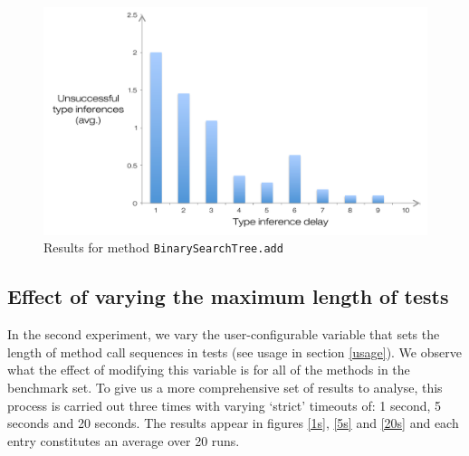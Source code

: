 \begin{figure}[h]
\hspace*{-0.5cm}
\centering
\includegraphics[scale=0.55]{./components/chapter7/bst.pdf}
\caption{Results for method \texttt{BinarySearchTree.add}}
\label{bstbench}
\end{figure}

\subsection{Effect of varying the maximum length of tests}
\label{exp2}
In the second experiment, we vary the user-configurable variable that sets the length of method call sequences in tests (see usage in section \ref{usage}). We observe what the effect of modifying this variable is for all of the methods in the benchmark set. To give us a more comprehensive set of results to analyse, this process is carried out three times with varying `strict' timeouts of: 1 second, 5 seconds and 20 seconds. The results appear in figures \ref{1s}, \ref{5s} and \ref{20s} and each entry constitutes an average over 20 runs.

